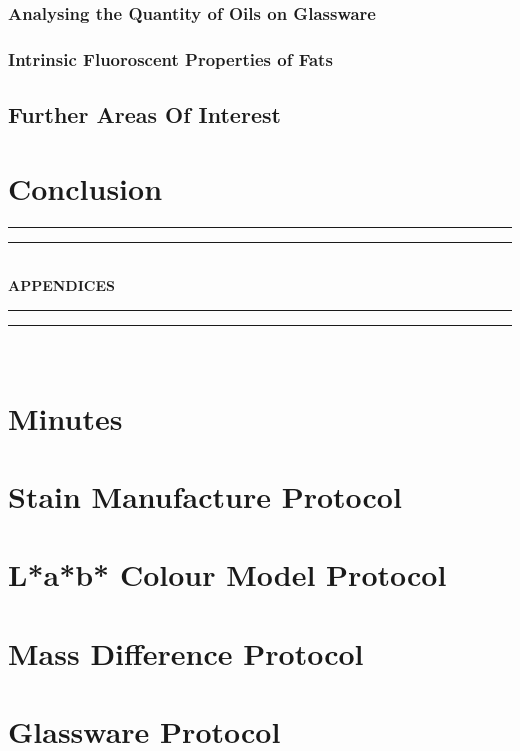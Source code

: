 \documentclass[a4paper ,12pt]{article}
\begin{document}
\subsubsection{Analysing the Quantity of Oils on Glassware}
\subsubsection{Intrinsic Fluoroscent Properties of Fats}

\subsection{Further Areas Of Interest}




\section{Conclusion}


\newpage
\begin{center}
\rule{\textwidth}{1.6pt}\vspace*{-\baselineskip}\vspace*{2pt} 
\rule{\textwidth}{0.4pt}\\[\baselineskip]
{\LARGE \bfseries{APPENDICES}}\\[0.2\baselineskip]
\rule{\textwidth}{0.4pt}\vspace*{-\baselineskip}\vspace{3.2pt} 
\rule{\textwidth}{1.6pt}\\[\baselineskip]
\end{center}
\appendix
\section{Minutes}
\section{Stain Manufacture Protocol}
\section{L*a*b* Colour Model Protocol}
\section{Mass Difference Protocol}
\section{Glassware Protocol}
\end{document}
